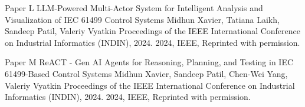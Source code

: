 \documentclass[12pt,a4paper,openright,final,twoside]{cseethesis}
\begin{document}

\makepaperaccepted
  {\paperheader}
  {\papertitle}
  {\paperauthorstring}
  {}
  {\copyrightstring}



\def\paperheader{Paper L}
\def\papertitle{LLM-Powered Multi-Actor System for Intelligent Analysis and Visualization of IEC 61499 Control Systems}
\def\paperauthorstring{Midhun Xavier, Tatiana Laikh, Sandeep Patil, Valeriy Vyatkin}
\def\referencestring{Proceedings of the IEEE International Conference on Industrial Informatics (INDIN), 2024.}
\def\copyrightstring{2024, IEEE, Reprinted with permission.}


\makepaperaccepted
  {\paperheader}
  {\papertitle}
  {\paperauthorstring}
  {\referencestring}
  {\copyrightstring}



\def\paperheader{Paper M}
\def\papertitle{ReACT - Gen AI Agents for Reasoning, Planning, and Testing in IEC 61499-Based Control Systems}
\def\paperauthorstring{Midhun Xavier, Sandeep Patil, Chen-Wei Yang, Valeriy Vyatkin}
\def\referencestring{Proceedings of the IEEE International Conference on Industrial Informatics (INDIN), 2024.}
\def\copyrightstring{2024, IEEE, Reprinted with permission.}


\makepaperaccepted
  {\paperheader}
  {\papertitle}
  {\paperauthorstring}
  {\referencestring}
  {\copyrightstring}






\printglossary[type=\acronymtype]
\end{document}
